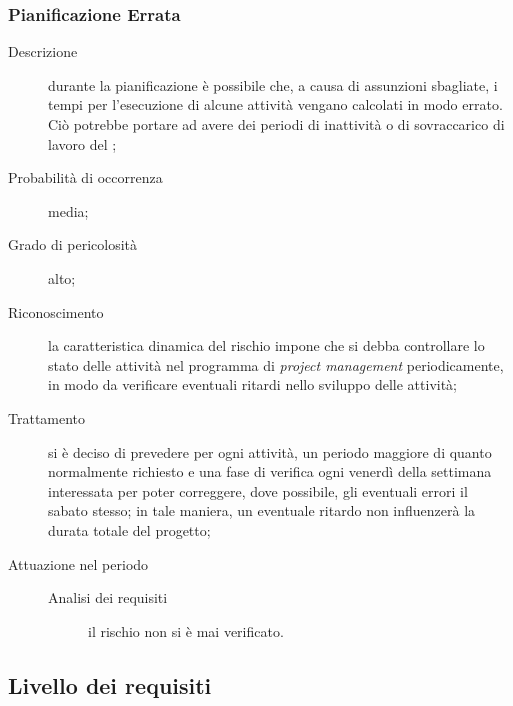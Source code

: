 		\subsubsection{Pianificazione Errata}
		\begin{description}
			\item[Descrizione] durante la pianificazione è possibile che, a causa di assunzioni sbagliate, i tempi per l'esecuzione di alcune attività vengano calcolati in modo errato. Ciò potrebbe portare ad avere dei periodi di inattività o di sovraccarico di lavoro del ;
			\item[Probabilità di occorrenza] media;
			\item[Grado di pericolosità] alto;
			\item[Riconoscimento] la caratteristica dinamica del rischio impone che si debba controllare lo stato delle attività nel programma di \emph{project management} periodicamente, in modo da verificare eventuali ritardi nello sviluppo delle attività; 
			\item[Trattamento] si è deciso di prevedere per ogni attività, un periodo maggiore di quanto normalmente richiesto e una fase di verifica ogni venerdì della settimana interessata per poter correggere, dove possibile, gli eventuali errori il sabato stesso; in tale maniera, un eventuale ritardo non influenzerà la durata totale del progetto; 
			\item[Attuazione nel periodo]
			\begin{description}
				\item[Analisi dei requisiti]  il rischio non si è mai verificato.
			\end{description}
		\end{description}
	\subsection{Livello dei requisiti} \label{sec:req}
